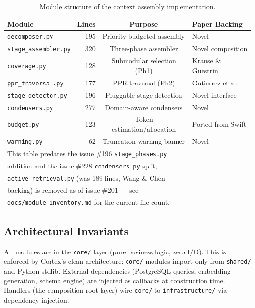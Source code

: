 \documentclass[11pt]{article}
\begin{document}
\begin{table}[h]
\centering
\caption{Module structure of the context assembly implementation.}
\label{tab:modules}
\small
\begin{tabular}{lrcl}
\toprule
Module & Lines & Purpose & Paper Backing \\
\midrule
\texttt{decomposer.py} & 195 & Priority-budgeted assembly & Novel \\
\texttt{stage\_assembler.py} & 320 & Three-phase assembler & Novel composition \\
\texttt{coverage.py} & 128 & Submodular selection (Ph1) & Krause \& Guestrin \\
\texttt{ppr\_traversal.py} & 177 & PPR traversal (Ph2) & Gutierrez et al. \\
\texttt{stage\_detector.py} & 196 & Pluggable stage detection & Novel interface \\
\texttt{condensers.py} & 277 & Domain-aware condensers & Novel \\
\texttt{budget.py} & 123 & Token estimation/allocation & Ported from Swift \\
\texttt{warning.py} & 62 & Truncation warning banner & Novel \\
\bottomrule
\multicolumn{4}{l}{\footnotesize This table predates the issue \#196 \texttt{stage\_phases.py}} \\
\multicolumn{4}{l}{\footnotesize addition and the issue \#228 \texttt{condensers.py} split;} \\
\multicolumn{4}{l}{\footnotesize \texttt{active\_retrieval.py} (was 189 lines, Wang \& Chen} \\
\multicolumn{4}{l}{\footnotesize backing) is removed as of issue \#201 --- see} \\
\multicolumn{4}{l}{\footnotesize \texttt{docs/module-inventory.md} for the current file count.} \\
\end{tabular}
\end{table}

\subsection{Architectural Invariants}

All modules are in the \texttt{core/} layer (pure business logic, zero
I/O).  This is enforced by Cortex's clean architecture:
\texttt{core/} modules import only from \texttt{shared/} and Python
stdlib.  External dependencies (PostgreSQL queries, embedding
generation, schema engine) are injected as callbacks at construction
time.  Handlers (the composition root layer) wire \texttt{core/} to
\texttt{infrastructure/} via dependency injection.
\end{document}

